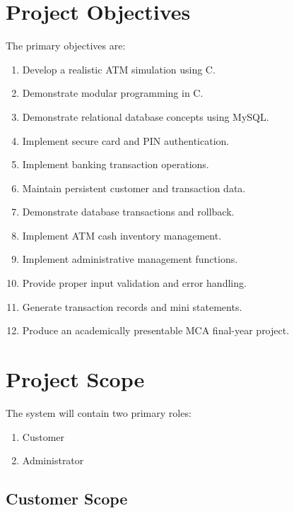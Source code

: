 \documentclass[12pt,a4paper]{article}
\begin{document}
\section{Project Objectives}

The primary objectives are:

\begin{enumerate}
    \item Develop a realistic ATM simulation using C.
    \item Demonstrate modular programming in C.
    \item Demonstrate relational database concepts using MySQL.
    \item Implement secure card and PIN authentication.
    \item Implement banking transaction operations.
    \item Maintain persistent customer and transaction data.
    \item Demonstrate database transactions and rollback.
    \item Implement ATM cash inventory management.
    \item Implement administrative management functions.
    \item Provide proper input validation and error handling.
    \item Generate transaction records and mini statements.
    \item Produce an academically presentable MCA final-year project.
\end{enumerate}


\section{Project Scope}

The system will contain two primary roles:

\begin{enumerate}
    \item Customer
    \item Administrator
\end{enumerate}

\subsection{Customer Scope}
\end{document}
